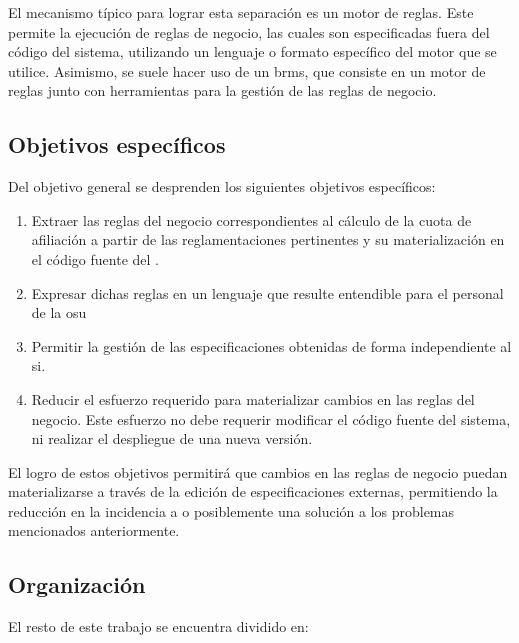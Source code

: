 El mecanismo típico para lograr esta separación es un motor de reglas. Este permite la ejecución de reglas de negocio, las cuales son especificadas fuera del código del sistema, utilizando un lenguaje o formato específico del motor que se utilice.
Asimismo, se suele hacer uso de un \acrfull{brms}, que consiste en un motor de reglas junto con herramientas para la gestión de las reglas de negocio.

\subsection{Objetivos específicos}

Del objetivo general se desprenden los siguientes objetivos específicos:
\begin{enumerate}
    \item 
    Extraer las reglas del negocio correspondientes al cálculo de la cuota de afiliación a partir de las reglamentaciones pertinentes y su materialización en el código fuente del {\SIDOSPU}.
    \item \label{obj:esp:intelegible}
    Expresar dichas reglas en un lenguaje que resulte entendible para el personal de la \acrlong{osu}
    \item \label{obj:esp:independiente}
    Permitir la gestión de las especificaciones obtenidas de forma independiente al \acrshort{si}.
    \item Reducir el esfuerzo requerido para materializar cambios en las reglas del negocio. Este esfuerzo no debe requerir modificar el código fuente del sistema, ni realizar el despliegue de una nueva versión.
\end{enumerate}

El logro de estos objetivos permitirá que cambios en las reglas de negocio puedan materializarse a través de la edición de especificaciones externas,  permitiendo la reducción en la incidencia a o posiblemente una solución a los problemas mencionados anteriormente.

\subsection{Organización}
El resto de este trabajo se encuentra dividido en:
